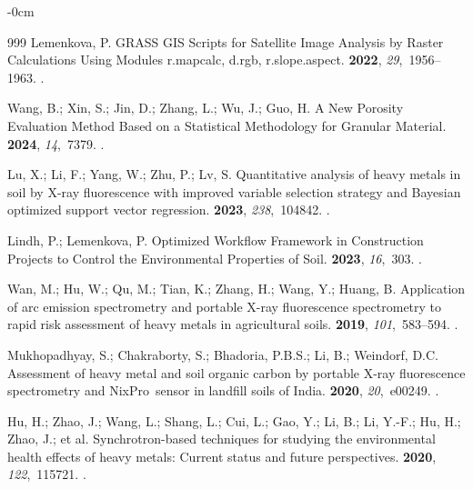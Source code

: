 \documentclass[environremediat,article,accept,pdftex,oneauthor]{Definitions/mdpi}
\begin{document}
\begin{adjustwidth}{-\extralength}{0cm}
\begin{thebibliography}{999}
Lemenkova, P.
\newblock GRASS GIS Scripts for Satellite Image Analysis by Raster Calculations
  Using Modules r.mapcalc, d.rgb, r.slope.aspect.
 {\bf 2022}, {\em 29},~1956--1963.
.

Wang, B.; Xin, S.; Jin, D.; Zhang, L.; Wu, J.; Guo, H.
\newblock A New Porosity Evaluation Method Based on a Statistical Methodology
  for Granular Material.
 {\bf 2024}, {\em 14},~7379.
.

Lu, X.; Li, F.; Yang, W.; Zhu, P.; Lv, S.
\newblock Quantitative analysis of heavy metals in soil by X-ray fluorescence
  with improved variable selection strategy and Bayesian optimized support
  vector regression.
 {\bf 2023},
  {\em 238},~104842.
.

Lindh, P.; Lemenkova, P.
\newblock Optimized Workflow Framework in Construction Projects to Control the
  Environmental Properties of Soil.
 {\bf 2023}, {\em 16},~303.
.

Wan, M.; Hu, W.; Qu, M.; Tian, K.; Zhang, H.; Wang, Y.; Huang, B.
\newblock Application of arc emission spectrometry and portable X-ray
  fluorescence spectrometry to rapid risk assessment of heavy metals in
  agricultural soils.
 {\bf 2019}, {\em 101},~583--594.
.

Mukhopadhyay, S.; Chakraborty, S.; Bhadoria, P.B.S.; Li, B.; Weindorf, D.C.
\newblock Assessment of heavy metal and soil organic carbon by portable X-ray
  fluorescence spectrometry and NixPro\texttrademark\ sensor in landfill soils
  of India.
 {\bf 2020}, {\em 20},~e00249.
.

Hu, H.; Zhao, J.; Wang, L.;  Shang, L.; Cui, L.; Gao, Y.; Li, B.; Li, Y.-F.; Hu, H.; Zhao, J.; et al.
\newblock Synchrotron-based techniques for studying the environmental health
  effects of heavy metals: Current status and future perspectives.
 {\bf 2020}, {\em
  122},~115721.
.


\end{thebibliography}
\end{adjustwidth}
\end{document}
